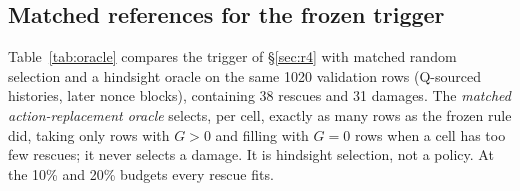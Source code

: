 \subsection{Matched references for the frozen trigger}
\label{app:oracle}

Table~\ref{tab:oracle} compares the trigger of \S\ref{sec:r4} with matched random selection and a hindsight oracle on the same 1020 validation rows (Q-sourced histories, later nonce blocks), containing 38 rescues and 31 damages. The \emph{matched action-replacement oracle} selects, per cell, exactly as many rows as the frozen rule did, taking only rows with $G>0$ and filling with $G=0$ rows when a cell has too few rescues; it never selects a damage. It is hindsight selection, not a policy. At the 10\% and 20\% budgets every rescue fits. %

